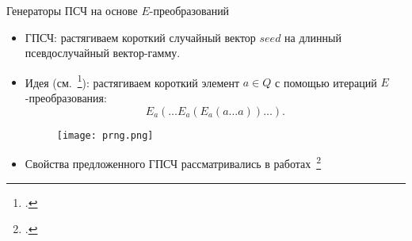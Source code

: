 

\begin{frame}{Генераторы ПСЧ на основе $E$-преобразований}
    \begin{itemize}
        \item ГПСЧ: растягиваем короткий случайный вектор $seed$ на длинный псевдослучайный вектор-гамму.
        \pause
        \item Идея (см.~\footcite{dimitrova2004quasigroup, markovski2005unbiased}): растягиваем короткий элемент $a \in Q$ с помощью итераций $E$-преобразования:
        \[
            E_{a} \left( \ldots E_{a} \left( E_{a} \left( a \ldots a \right) \right) \ldots \right).
        \]
        \pause
        \begin{figure}[h]
            \centering 
            \texttt{[image: prng.png]}
        \end{figure}
        \item Свойства предложенного ГПСЧ рассматривались в работах~\footcite{markovski2003quasigroup, markovski2005classification, markovski2005unbiased}
    \end{itemize}
\end{frame}


